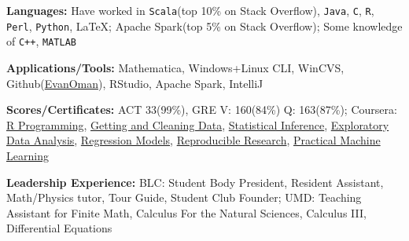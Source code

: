 \documentclass[letterpaper,10pt]{article}
\begin{document}

		\justifying
		
		\textbf{Languages:}
			Have worked in \verb!Scala!(top 10\% on Stack Overflow), \verb!Java!, \verb!C!, \verb!R!, \verb!Perl!, \verb!Python!, \LaTeX; Apache Spark(top 5\% on Stack Overflow); Some knowledge of \verb!C++!, \verb!MATLAB!

		\textbf{Applications/Tools:}
		Mathematica, Windows+Linux CLI, WinCVS, Github(\href{https://www.github.com/EvanOman}{EvanOman}), RStudio, Apache Spark, IntelliJ

		\textbf{Scores/Certificates:}
		ACT 33(99\%), GRE V: 160(84\%) Q: 163(87\%); Coursera: \href{https://www.coursera.org/account/accomplishments/records/cxq3vN5HB76be56t}{R Programming}, \href{https://www.coursera.org/account/accomplishments/records/Xt3sCA24Qz3Par7M}{Getting and Cleaning Data}, \href{https://www.coursera.org/account/accomplishments/records/yPex7nURcXCYdsse}{Statistical Inference}, \href{https://www.coursera.org/account/accomplishments/records/XMkgJcmHPGtNBXsU}{Exploratory Data Analysis}, \href{https://www.coursera.org/account/accomplishments/records/Qx8qaDCvw9ZNQtqP}{Regression Models}, \href{https://www.coursera.org/account/accomplishments/records/g5LfcvAD5rJuEnGX}{Reproducible Research},
		\href{https://www.coursera.org/account/accomplishments/verify/ZNTJVMJKSH}{Practical Machine Learning}

		\textbf{Leadership Experience:}
		BLC: Student Body President, Resident Assistant, Math/Physics tutor, Tour Guide, Student Club Founder; UMD: Teaching Assistant for Finite Math, Calculus For the Natural Sciences, Calculus III, Differential Equations
\end{document}
